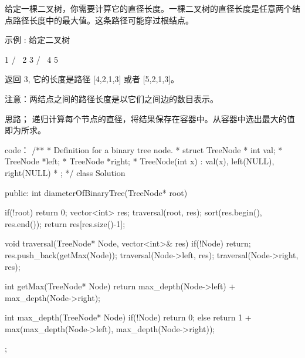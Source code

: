 给定一棵二叉树，你需要计算它的直径长度。一棵二叉树的直径长度是任意两个结点路径长度中的最大值。这条路径可能穿过根结点。

示例 :
给定二叉树

          1
         / \
        2   3
       / \     
      4   5    

返回 3, 它的长度是路径 [4,2,1,3] 或者 [5,2,1,3]。

注意：两结点之间的路径长度是以它们之间边的数目表示。

























思路；
递归计算每个节点的直径，将结果保存在容器中。从容器中选出最大的值即为所求。






























code：
/**
 * Definition for a binary tree node.
 * struct TreeNode {
 *     int val;
 *     TreeNode *left;
 *     TreeNode *right;
 *     TreeNode(int x) : val(x), left(NULL), right(NULL) {}
 * };
 */
class Solution {
public:
    int diameterOfBinaryTree(TreeNode* root) {
        if(!root) return 0;
        vector<int> res;
        traversal(root, res);
        sort(res.begin(), res.end());
        return res[res.size()-1];
        
    }
    void traversal(TreeNode* Node, vector<int>& res)
    {
        if(!Node) return;
        res.push_back(getMax(Node));
        traversal(Node->left, res);
        traversal(Node->right, res);
    }
            
    int getMax(TreeNode* Node)
    {
        return max_depth(Node->left) + max_depth(Node->right);
    }
    
    int max_depth(TreeNode* Node)
    {
        if(!Node) return 0;
        else return 1 + max(max_depth(Node->left), max_depth(Node->right));
    }
};